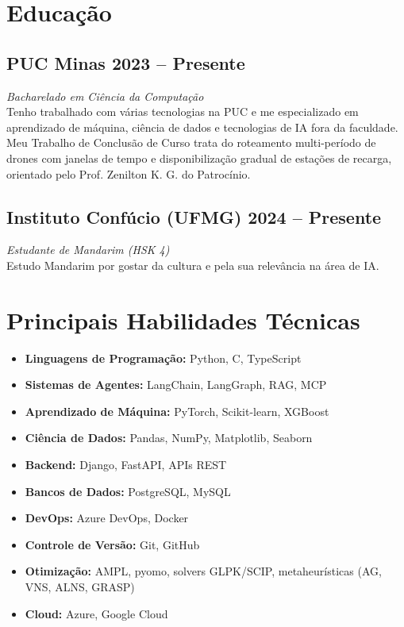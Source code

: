 \documentclass[a4paper,10pt]{article}
\begin{document}
\section*{ Educação}

\subsection*{PUC Minas \hfill 2023 -- Presente}
\textit{Bacharelado em Ciência da Computação} \\
Tenho trabalhado com várias tecnologias na PUC e me especializado em aprendizado de máquina, ciência de dados e tecnologias de IA fora da faculdade. Meu Trabalho de Conclusão de Curso trata do roteamento multi-período de drones com janelas de tempo e disponibilização gradual de estações de recarga, orientado pelo Prof. Zenilton K. G. do Patrocínio.

\subsection*{Instituto Confúcio (UFMG) \hfill 2024 -- Presente}
\textit{Estudante de Mandarim (HSK 4)} \\
Estudo Mandarim por gostar da cultura e pela sua relevância na área de IA.

\section*{ Principais Habilidades Técnicas}
\begin{center}
    \begin{itemize}[label=, itemsep=-3pt]
        \item \textbf{Linguagens de Programação:} Python, C, TypeScript
        \item \textbf{Sistemas de Agentes:} LangChain, LangGraph, RAG, MCP
        \item \textbf{Aprendizado de Máquina:} PyTorch, Scikit-learn, XGBoost
        \item \textbf{Ciência de Dados:} Pandas, NumPy, Matplotlib, Seaborn
        \item \textbf{Backend:} Django, FastAPI, APIs REST
        \item \textbf{Bancos de Dados:} PostgreSQL, MySQL
        \item \textbf{DevOps:} Azure DevOps, Docker
        \item \textbf{Controle de Versão:} Git, GitHub
        \item \textbf{Otimização:} AMPL, pyomo, solvers GLPK/SCIP, metaheurísticas (AG, VNS, ALNS, GRASP)
        \item \textbf{Cloud:} Azure, Google Cloud
    \end{itemize}
\end{center}
\end{document}
